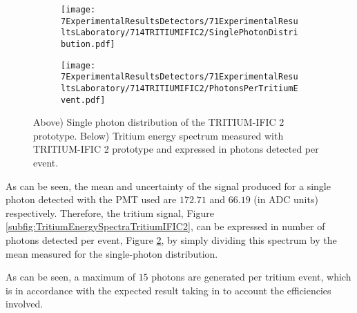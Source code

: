 \begin{figure}
\centering
    \begin{subfigure}[b]{0.73\textwidth}
    \centering
    \texttt{[image: 7ExperimentalResultsDetectors/71ExperimentalResultsLaboratory/714TRITIUMIFIC2/SinglePhotonDistribution.pdf]}  
    \caption{\label{subfig:SinglePhotonDistributionIFIC2}}
    \end{subfigure}
    \hfill
    \begin{subfigure}[b]{0.73\textwidth}
    \centering
    \texttt{[image: 7ExperimentalResultsDetectors/71ExperimentalResultsLaboratory/714TRITIUMIFIC2/PhotonsPerTritiumEvent.pdf]}  
    \caption{\label{subfig:TritiumSignalTRITIUMIFIC2}}
    \end{subfigure}
 \caption{Above) Single photon distribution of the TRITIUM-IFIC 2 prototype. Below) Tritium energy spectrum measured with TRITIUM-IFIC 2 prototype and expressed in photons detected per event.}
 \label{fig:PhotonsPerTritiumEventIFIC2}
\end{figure}


As can be seen, the mean and uncertainty of the signal produced for a single photon detected with the PMT used are $172.71$ and $66.19$ (in ADC units) respectively. Therefore, the tritium signal, Figure \ref{subfig:TritiumEnergySpectraTritiumIFIC2}, can be expressed in number of photons detected per event, Figure \ref{subfig:TritiumSignalTRITIUMIFIC2}, by simply dividing this spectrum by the mean measured for the single-photon distribution.


As can be seen, a maximum of $15$ photons are generated per tritium event, which is in accordance with the expected result taking in to account the efficiencies involved. 

